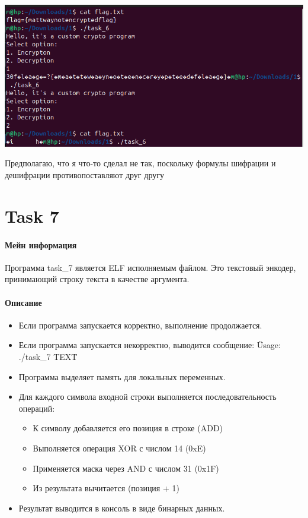     \paragraph{}
    \includegraphics[width=1\linewidth]{static/_task_6.png}

    Предполагаю, что я что-то сделал не так, поскольку формулы шифрации и дешифрации противопоставляют друг другу

    \section*{Task 7}

    \paragraph{Мейн информация}
    Программа task\_7 является ELF исполняемым файлом.
    Это текстовый энкодер, принимающий строку текста в качестве аргумента.

    \paragraph{Описание}

    \begin{itemize}
        \item Если программа запускается корректно, выполнение продолжается.
        \item Если программа запускается некорректно, выводится сообщение: \"Usage: ./task\_7 TEXT\"
        \item Программа выделяет память для локальных переменных.
        \item Для каждого символа входной строки выполняется последовательность операций:
        \begin{itemize}
            \item К символу добавляется его позиция в строке (ADD)
            \item Выполняется операция XOR с числом 14 (0xE)
            \item Применяется маска через AND с числом 31 (0x1F)
            \item Из результата вычитается (позиция + 1)
        \end{itemize}
        \item Результат выводится в консоль в виде бинарных данных.
    \end{itemize}

